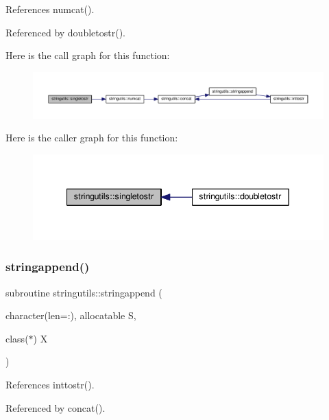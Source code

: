 References numcat().



Referenced by doubletostr().

Here is the call graph for this function\+:
\nopagebreak
\begin{figure}[H]
\begin{center}
\leavevmode
\includegraphics[width=350pt]{namespacestringutils_a9ee073baf898c055562e20577ad27013_cgraph}
\end{center}
\end{figure}
Here is the caller graph for this function\+:
\nopagebreak
\begin{figure}[H]
\begin{center}
\leavevmode
\includegraphics[width=340pt]{namespacestringutils_a9ee073baf898c055562e20577ad27013_icgraph}
\end{center}
\end{figure}
\mbox{\label{namespacestringutils_a921ef80710acba9d901b45479ddae08d}} 
\subsubsection{\texorpdfstring{stringappend()}{stringappend()}}
{\footnotesize\ttfamily subroutine stringutils\+::stringappend (\begin{DoxyParamCaption}\item[{character(len=\+:), allocatable}]{S,  }\item[{class($\ast$)}]{X }\end{DoxyParamCaption})}



References inttostr().



Referenced by concat().

